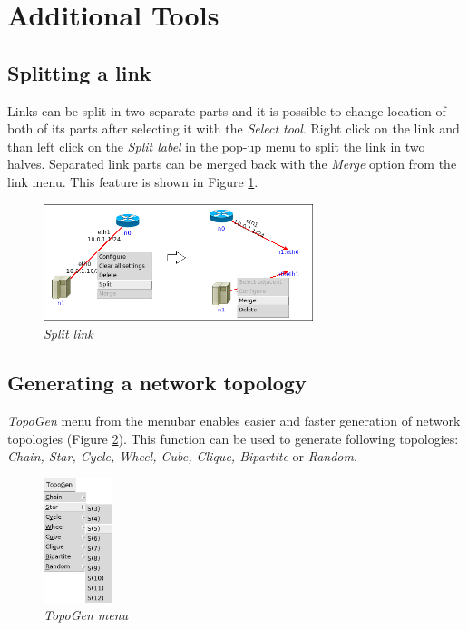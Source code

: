 \section{Additional Tools}
\subsection{Splitting a link}
Links can be split in two separate parts and it is possible to change location
of both of its parts after selecting it with the \emph{Select tool}. Right
click on the link and than left click on the \emph{Split label} in the pop-up
menu to split the link in two halves. Separated link parts can be merged back
with the \emph{Merge} option from the link menu. This feature is shown in
Figure \ref{fig:split_link}.

\begin{figure}[H]
\centering
\vspace{10pt}
\includegraphics[width=0.7\textwidth]{./images/split_link.png}
\caption{\emph{Split link}}
\label{fig:split_link}
\end{figure}

\subsection{Generating a network topology}
\label{sec:GeneratingNetworkTopology}
\emph{TopoGen} menu from the menubar enables easier and faster generation of
network topologies (Figure \ref{fig:topogen_menu_star}). This function can be
used to generate following topologies: \emph{Chain, Star, Cycle, Wheel, Cube,
Clique, Bipartite} or \emph{Random}. 

\begin{figure}[H]
\centering
\vspace{10pt}
\includegraphics[width=0.18\textwidth]{./images/topogen_menu_star.png}
\caption{\emph{TopoGen menu}}
\label{fig:topogen_menu_star}
\end{figure}

